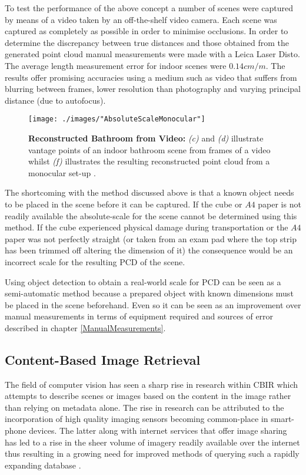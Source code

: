 To test the performance of the above concept a number of scenes were captured by means of a video taken by an off-the-shelf video camera. Each scene was captured as completely as possible in order to minimise occlusions. In order to determine the discrepancy between true distances and those obtained from the generated point cloud manual measurements were made with a Leica Laser Disto. The average length measurement error for indoor scenes were $0.14cm/m$. The results offer promising accuracies using a medium such as video that suffers from blurring between frames, lower resolution than photography and varying principal distance (due to autofocus).
\begin{figure}[ht!]
	\centering
	\texttt{[image: ./images/"AbsoluteScaleMonocular"]}
	\caption[Bathroom reconstruction using a monocular set-up]{\textbf{Reconstructed Bathroom from Video:} \textit{(c)} and \textit{(d)} illustrate vantage points of an indoor bathroom scene from frames of a video whilst \textit{(f)} illustrates the resulting reconstructed point cloud from a monocular set-up \citep{rashidi_generating_2014}.
		\label{monocular}}
\end{figure}
\vspace{-2.5mm}
\newline
The shortcoming with the method discussed above is that a known object needs to be placed in the scene before it can be captured. If the cube or $A4$ paper is not readily available the absolute-scale for the scene cannot be determined using this method. If the cube experienced physical damage during transportation or the $A4$ paper was not perfectly straight (or taken from an exam pad where the top strip has been trimmed off altering the dimension of it) the consequence would be an incorrect scale for the resulting PCD of the scene.

Using object detection to obtain a real-world scale for PCD can be seen as a semi-automatic method because a prepared object with known dimensions must be placed in the scene beforehand. Even so it can be seen as an improvement over manual measurements in terms of equipment required and sources of error described in chapter \ref{ManualMeasurements}. 


\subsection{Content-Based Image Retrieval\label{CBIR}}

The field of computer vision has seen a sharp rise in research within CBIR which attempts to describe scenes or images based on the content in the image rather than relying on metadata alone. The rise in research can be attributed to the incorporation of high quality imaging sensors becoming common-place in smart-phone devices. The latter along with internet services that offer image sharing has led to a rise in the sheer volume of imagery readily available over the internet thus resulting in a growing need for improved methods of querying such a rapidly expanding database \citep{yeh_searching_2004}.  

